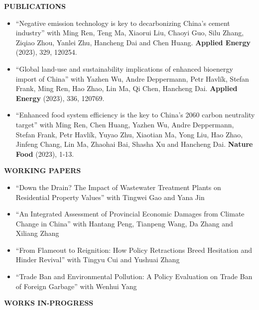 \documentclass[UTF8]{ctexbook}
\begin{document}
\begin{center}
    \textbf{PUBLICATIONS}
\end{center}


\begin{itemize}
    \item ``Negative emission technology is key to decarbonizing China's cement industry'' with Ming Ren, Teng Ma, Xiaorui Liu, Chaoyi Guo, Silu Zhang, Ziqiao Zhou, Yanlei Zhu, Hancheng Dai and Chen Huang. \textbf{Applied Energy} (2023), 329, 120254.

    \item ``Global land-use and sustainability implications of enhanced bioenergy import of China'' with Yazhen Wu, Andre Deppermann, Petr Havlík, Stefan Frank, Ming Ren, Hao Zhao, Lin Ma, Qi Chen, Hancheng Dai. \textbf{Applied Energy} (2023), 336, 120769.

    \item ``Enhanced food system efficiency is the key to China's 2060 carbon neutrality target'' with Ming Ren, Chen Huang, Yazhen Wu, Andre Deppermann, Stefan Frank, Petr Havlík, Yuyao Zhu, Xiaotian Ma, Yong Liu, Hao Zhao, Jinfeng Chang, Lin Ma, Zhaohai Bai, Shasha Xu and Hancheng Dai. \textbf{Nature Food} (2023), 1-13.
\end{itemize}

\vspace{12pt}

\begin{center}
    \textbf{WORKING PAPERS}
\end{center}


\begin{itemize}
    \item ``Down the Drain? The Impact of Wastewater Treatment Plants on Residential Property Values'' with Tingwei Gao and Yana Jin
    \item ``An Integrated Assessment of Provincial Economic Damages from Climate Change in China'' with Hantang Peng, Tianpeng Wang, Da Zhang and Xiliang Zhang
    \item ``From Flameout to Reignition: How Policy Retractions Breed Hesitation and Hinder Revival'' with Tingyu Cui and Yushuai Zhang
    \item ``Trade Ban and Environmental Pollution: A Policy Evaluation on Trade Ban of Foreign Garbage'' with Wenhui Yang
\end{itemize}

\vspace{12pt}


\begin{center}
    \textbf{WORKS IN-PROGRESS}
\end{center}
\end{document}
